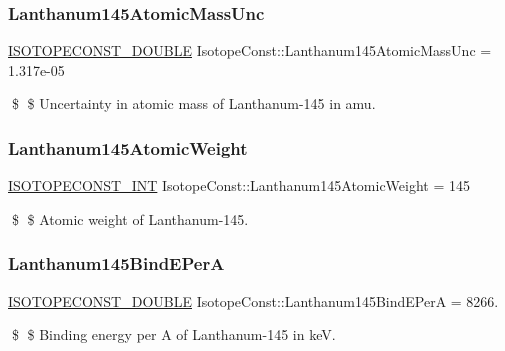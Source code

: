 \subsubsection{\texorpdfstring{Lanthanum145\+Atomic\+Mass\+Unc}{Lanthanum145AtomicMassUnc}}
{\footnotesize\ttfamily \mbox{\hyperlink{group___isotope_const-_macros_ga8f45a7272ce02c0b4c65c44636ed719a}{I\+S\+O\+T\+O\+P\+E\+C\+O\+N\+S\+T\+\_\+\+D\+O\+U\+B\+LE}} Isotope\+Const\+::\+Lanthanum145\+Atomic\+Mass\+Unc = 1.\+317e-\/05}

\$ \$ Uncertainty in atomic mass of Lanthanum-\/145 in amu. \mbox{\label{group___isotope_const-_lanthanum-_la145_ga9c5a90a1d7aae029121b83b9047f1124}} 
\subsubsection{\texorpdfstring{Lanthanum145\+Atomic\+Weight}{Lanthanum145AtomicWeight}}
{\footnotesize\ttfamily \mbox{\hyperlink{group___isotope_const-_macros_ga5f18360b3e99483a35c32d789e62621c}{I\+S\+O\+T\+O\+P\+E\+C\+O\+N\+S\+T\+\_\+\+I\+NT}} Isotope\+Const\+::\+Lanthanum145\+Atomic\+Weight = 145}

\$ \$ Atomic weight of Lanthanum-\/145. \mbox{\label{group___isotope_const-_lanthanum-_la145_ga75eb2038a90254c0fceabd37b1684d67}} 
\subsubsection{\texorpdfstring{Lanthanum145\+Bind\+E\+PerA}{Lanthanum145BindEPerA}}
{\footnotesize\ttfamily \mbox{\hyperlink{group___isotope_const-_macros_ga8f45a7272ce02c0b4c65c44636ed719a}{I\+S\+O\+T\+O\+P\+E\+C\+O\+N\+S\+T\+\_\+\+D\+O\+U\+B\+LE}} Isotope\+Const\+::\+Lanthanum145\+Bind\+E\+PerA = 8266.}

\$ \$ Binding energy per A of Lanthanum-\/145 in keV. \mbox{\label{group___isotope_const-_lanthanum-_la145_ga94f26e83794344b8c57fdfa7f09dab63}} 
